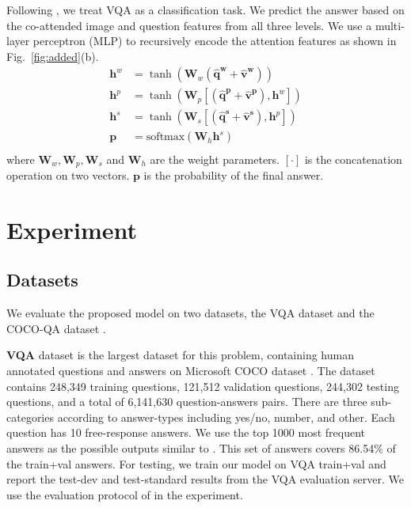 \documentclass{article}
\begin{document}
Following \cite{antol2015vqa}, we treat VQA as a classification task. We predict the answer based on the co-attended image and question features from all three levels. We use a multi-layer perceptron (MLP) to recursively encode the attention features as shown in Fig.~\ref{fig:added}(b).
\begin{equation}
\begin{aligned}
\bm{h}^w &= \tanh(\bm{W}_{w} (\bm{\hat{q}^w} + \bm{\hat{v}^w})) \\
\bm{h}^p &= \tanh(\bm{W}_{p} [(\bm{\hat{q}^p} + \bm{\hat{v}^p}), \bm{h}^w]) \\
\bm{h}^s &= \tanh(\bm{W}_{s} [(\bm{\hat{q}^s} + \bm{\hat{v}^s}), \bm{h}^p]) \\
\bm{p} &= \textrm{softmax}(\bm{W}_{h} \bm{h}^s) \\
\end{aligned}
\end{equation}
where $\bm{W}_{w}, \bm{W}_{p}, \bm{W}_{s}$ and $\bm{W}_{h}$ are the weight parameters. $[\cdot]$ is the concatenation operation on two vectors. $\bm{p}$ is the probability of the final answer.  
%
 \section{Experiment}
\vspace*{-2mm}
\label{sec:exp}
\subsection{Datasets}
We evaluate the proposed model on two datasets, the VQA dataset \cite{antol2015vqa} and the COCO-QA dataset \cite{ren2015exploring}.

\textbf{VQA} dataset \cite{antol2015vqa} is the largest dataset for this problem, containing human annotated questions and answers on Microsoft COCO dataset \cite{lin2014microsoft}. The dataset contains 248,349 training questions, 121,512 validation questions, 244,302 testing questions, and a total of 6,141,630 question-answers pairs. There are three sub-categories according to answer-types including yes/no, number, and other. Each question has 10 free-response answers. We use the top 1000 most frequent answers as the possible outputs similar to \cite{antol2015vqa}. This set of answers covers 86.54\% of the train+val answers. For testing, we train our model on VQA train+val and report the test-dev and test-standard results from the VQA evaluation server. We use the evaluation protocol of \cite{antol2015vqa} in the experiment.
\end{document}
